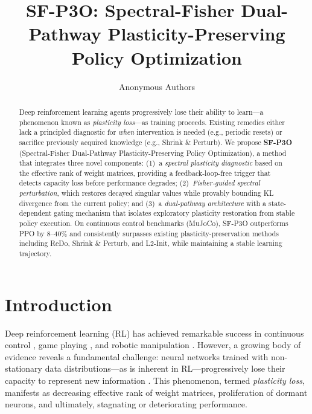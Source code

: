 \documentclass{article}
\title{\textbf{SF-P3O: Spectral-Fisher Dual-Pathway Plasticity-Preserving Policy Optimization}}
\author{
  Anonymous Authors
}
\date{}
\begin{document}
\maketitle

\begin{abstract}
Deep reinforcement learning agents progressively lose their ability to learn---a phenomenon known as \emph{plasticity loss}---as training proceeds. Existing remedies either lack a principled diagnostic for \emph{when} intervention is needed (e.g., periodic resets) or sacrifice previously acquired knowledge (e.g., Shrink \& Perturb). We propose \textbf{SF-P3O} (Spectral-Fisher Dual-Pathway Plasticity-Preserving Policy Optimization), a method that integrates three novel components: (1)~a \emph{spectral plasticity diagnostic} based on the effective rank of weight matrices, providing a feedback-loop-free trigger that detects capacity loss before performance degrades; (2)~\emph{Fisher-guided spectral perturbation}, which restores decayed singular values while provably bounding KL divergence from the current policy; and (3)~a \emph{dual-pathway architecture} with a state-dependent gating mechanism that isolates exploratory plasticity restoration from stable policy execution. On continuous control benchmarks (MuJoCo), SF-P3O outperforms PPO by 8--40\% and consistently surpasses existing plasticity-preservation methods including ReDo, Shrink \& Perturb, and L2-Init, while maintaining a stable learning trajectory.
\end{abstract}

\section{Introduction}
\label{sec:intro}

Deep reinforcement learning (RL) has achieved remarkable success in continuous control \citep{schulman2017ppo,haarnoja2018sac}, game playing \citep{silver2017mastering}, and robotic manipulation \citep{levine2016end}. However, a growing body of evidence reveals a fundamental challenge: neural networks trained with non-stationary data distributions---as is inherent in RL---progressively lose their capacity to represent new information \citep{lyle2023understanding,dohare2024loss,kumar2020implicit}. This phenomenon, termed \emph{plasticity loss}, manifests as decreasing effective rank of weight matrices, proliferation of dormant neurons, and ultimately, stagnating or deteriorating performance.
\end{document}
